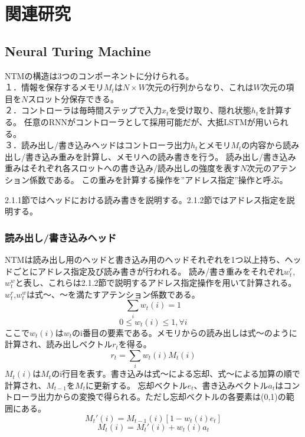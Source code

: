 \chapter{関連研究}

\section{Neural Turing Machine}
NTMの構造は3つのコンポーネントに分けられる。
\\１．情報を保存するメモリ$M_t$は$N×W$次元の行列からなり、これは$W$次元の項目を$N$スロット分保存できる。
\\２．コントローラは毎時間ステップで入力$x_t$を受け取り、隠れ状態$h_t$を計算する。
任意のRNNがコントローラとして採用可能だが、大抵LSTMが用いられる。
\\３．読み出し/書き込みヘッドはコントローラ出力$h_t$とメモリ$M_t$の内容から読み出し/書き込み重みを計算し、メモリへの読み書きを行う。
読み出し/書き込み重みはそれぞれ各スロットへの書き込み/読み出しの強度を表す$N$次元のアテンション係数である。
この重みを計算する操作を”アドレス指定”操作と呼ぶ。

2.1.1節ではヘッドにおける読み書きを説明する。2.1.2節ではアドレス指定を説明する。

\subsection{読み出し/書き込みヘッド}
NTMは読み出し用のヘッドと書き込み用のヘッドそれぞれを1つ以上持ち、ヘッドごとにアドレス指定及び読み書きが行われる。
読み/書き重みをそれぞれ$w^r_t$,$w^w_t$と表し、これらは2.1.2節で説明するアドレス指定操作を用いて計算される。
$w^r_t$,$w^w_t$は式～、～を満たすアテンション係数である。
\begin{equation}
	\sum_{i}w_t(i) = 1
\end{equation}
\begin{equation}
	0\leq w_t(i)\leq 1 , \forall i
\end{equation}
ここで$w_t(i)$は$w_t$のi番目の要素である。メモリからの読み出しは式～のように計算され、読み出しベクトル$r_t$を得る。
\begin{equation}
	r_t = \sum_{i}w_t(i)M_t(i)
\end{equation}
$M_t(i)$は$M_t$のi行目を表す。書き込みは式～による忘却、式～による加算の順で計算され、$M_{t-1}$を$M_t$に更新する。
忘却ベクトル$e_t$、書き込みベクトル$a_t$はコントローラ出力からの変換で得られる。ただし忘却ベクトルの各要素は(0,1)の範囲にある。
\begin{equation}
	M_t'(i) = M_{t-1}(i)[1-w_t(i)e_t]
\end{equation}
\begin{equation}
	M_t(i) = M_t'(i) + w_t(i)a_t
\end{equation}

